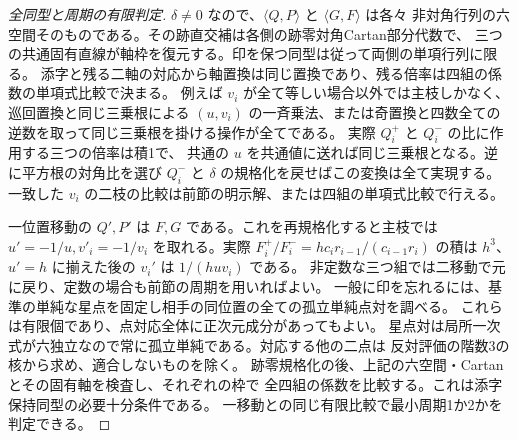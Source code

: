 \begin{proof}[全同型と周期の有限判定]
$\delta\ne0$ なので、$\langle Q,P\rangle$ と $\langle G,F\rangle$ は各々
非対角行列の六空間そのものである。その跡直交補は各側の跡零対角Cartan部分代数で、
三つの共通固有直線が軸枠を復元する。印を保つ同型は従って両側の単項行列に限る。
添字と残る二軸の対応から軸置換は同じ置換であり、残る倍率は四組の係数の単項式比較で決まる。
例えば $v_i$ が全て等しい場合以外では主枝しかなく、巡回置換と同じ三乗根による
$(u,v_i)$ の一斉乗法、または奇置換と四数全ての逆数を取って同じ三乗根を掛ける操作が全てである。
実際 $Q_i^+$ と $Q_i^-$ の比に作用する三つの倍率は積1で、
共通の $u$ を共通値に送れば同じ三乗根となる。逆に平方根の対角比を選び
$Q_i^-$ と $\delta$ の規格化を戻せばこの変換は全て実現する。
一致した $v_i$ の二枝の比較は前節の明示解、または四組の単項式比較で行える。

一位置移動の $Q',P'$ は $F,G$ である。これを再規格化すると主枝では
$u'=-1/u,v'_i=-1/v_i$ を取れる。実際 $F_i^+/F_i^-=h c_i r_{i-1}/(c_{i-1}r_i)$
の積は $h^3$、$u'=h$ に揃えた後の $v_i'$ は $1/(hu v_i)$ である。
非定数な三つ組では二移動で元に戻り、定数の場合も前節の周期を用いればよい。
一般に印を忘れるには、基準の単純な星点を固定し相手の同位置の全ての孤立単純点対を調べる。
これらは有限個であり、点対応全体に正次元成分があってもよい。
星点対は局所一次式が六独立なので常に孤立単純である。対応する他の二点は
反対評価の階数3の核から求め、適合しないものを除く。
跡零規格化の後、上記の六空間・Cartanとその固有軸を検査し、それぞれの枠で
全四組の係数を比較する。これは添字保持同型の必要十分条件である。
一移動との同じ有限比較で最小周期1か2かを判定できる。
\end{proof}
